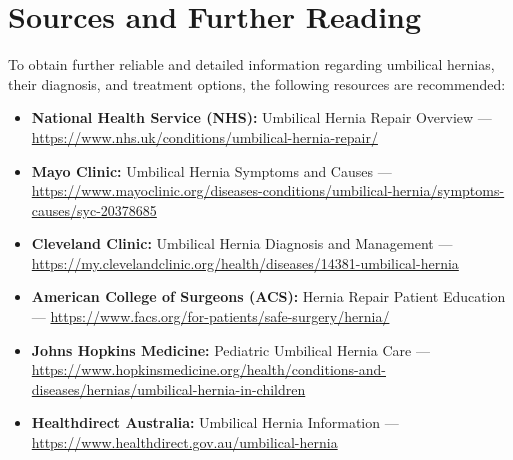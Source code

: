 \section*{Sources and Further Reading}
To obtain further reliable and detailed information regarding umbilical hernias, their diagnosis, and treatment options, the following resources are recommended:
\begin{itemize}
    \item \textbf{National Health Service (NHS):} Umbilical Hernia Repair Overview --- \url{https://www.nhs.uk/conditions/umbilical-hernia-repair/}
    \item \textbf{Mayo Clinic:} Umbilical Hernia Symptoms and Causes --- \url{https://www.mayoclinic.org/diseases-conditions/umbilical-hernia/symptoms-causes/syc-20378685}
    \item \textbf{Cleveland Clinic:} Umbilical Hernia Diagnosis and Management --- \url{https://my.clevelandclinic.org/health/diseases/14381-umbilical-hernia}
    \item \textbf{American College of Surgeons (ACS):} Hernia Repair Patient Education --- \url{https://www.facs.org/for-patients/safe-surgery/hernia/}
    \item \textbf{Johns Hopkins Medicine:} Pediatric Umbilical Hernia Care --- \url{https://www.hopkinsmedicine.org/health/conditions-and-diseases/hernias/umbilical-hernia-in-children}
    \item \textbf{Healthdirect Australia:} Umbilical Hernia Information --- \url{https://www.healthdirect.gov.au/umbilical-hernia}
\end{itemize}